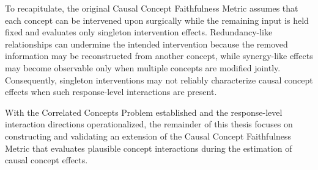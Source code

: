 To recapitulate, the original Causal Concept Faithfulness Metric assumes that each concept can be intervened upon surgically while the remaining input is held fixed and evaluates only singleton intervention effects. Redundancy-like relationships can undermine the intended intervention because the removed information may be reconstructed from another concept, while synergy-like effects may become observable only when multiple concepts are modified jointly. Consequently, singleton interventions may not reliably characterize causal concept effects when such response-level interactions are present.

With the Correlated Concepts Problem established and the response-level interaction directions operationalized, the remainder of this thesis focuses on constructing and validating an extension of the Causal Concept Faithfulness Metric that evaluates plausible concept interactions during the estimation of causal concept effects.
